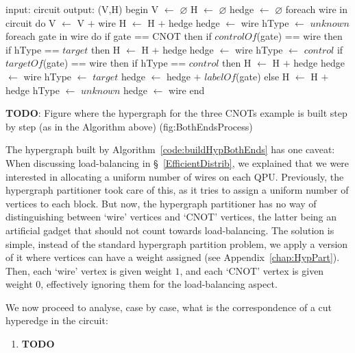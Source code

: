 \begin{algorithm}[caption={Builds the hypergraph of a given circuit, without choosing whether CNOT gates are implemented through common control or common target. \(H\) may contain multiple hyperedges connecting the same vertices.}, label={code:buildHypBothEnds}]
input: circuit
output: (V,H)
begin
  V $\gets$ $\varnothing$
  H $\gets$ $\varnothing$
  hedge $\gets$ $\varnothing$
  foreach wire in circuit do
    V $\gets$ V $+$ {wire}
    H $\gets$ H $+$ {hedge}
    hedge $\gets$ {wire}
    hType $\gets$ $unknown$
    foreach gate in wire do
      if gate == CNOT then
        if $controlOf$(gate) == wire then
          if hType == $target$ then
            H $\gets$ H $+$ {hedge}
            hedge $\gets$ {wire}
          hType $\gets$ $control$
        if $targetOf$(gate) == wire then
          if hType == $control$ then
            H $\gets$ H $+$ {hedge}
            hedge $\gets$ {wire}  
          hType $\gets$ $target$
        hedge $\gets$ hedge $+$ {$labelOf$(gate)}
      else
        H $\gets$ H $+$ {hedge}
        hType $\gets$ $unknown$
        hedge $\gets$ {wire}
end
\end{algorithm}

\textbf{TODO}: Figure where the hypergraph for the three CNOTs example is built step by step (as in the Algorithm above) (fig:BothEndsProcess)

The hypergraph built by Algorithm~\ref{code:buildHypBothEnds} has one caveat: When discussing load-balancing in \S~\ref{EfficientDistrib}, we explained that we were interested in allocating a uniform number of wires on each QPU. Previously, the hypergraph partitioner took care of this, as it tries to assign a uniform number of vertices to each block. But now, the hypergraph partitioner has no way of distinguishing between `wire' vertices and `CNOT' vertices, the latter being an artificial gadget that should not count towards load-balancing. The solution is simple, instead of the standard hypergraph partition problem, we apply a version of it where vertices can have a weight assigned (see Appendix~\ref{chap:HypPart}). Then, each `wire' vertex is given weight \(1\), and each `CNOT' vertex is given weight \(0\), effectively ignoring them for the load-balancing aspect.

We now proceed to analyse, case by case, what is the correspondence of a cut hyperedge in the circuit:

\begin{enumerate}
\item \textbf{TODO}
\end{enumerate}

